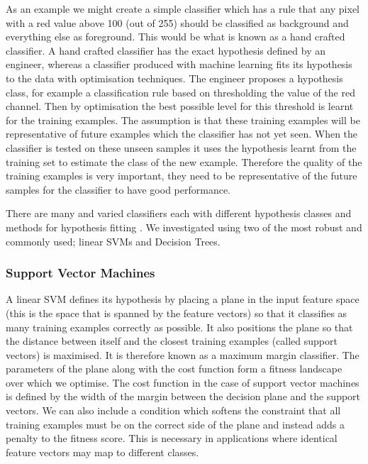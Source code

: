 \documentclass[12pt]{IIBproject}
\begin{document}
 As an example we might create a simple classifier which has a rule that any pixel with a red value above 100 (out of 255) should be classified as background and everything else as foreground. This would be what is known as a hand crafted classifier. A hand crafted classifier has the exact hypothesis defined by an engineer, whereas a classifier produced with machine learning fits its hypothesis to the data with optimisation techniques. The engineer proposes a hypothesis class, for example a classification rule based on thresholding the value of the red channel. Then by optimisation the best possible level for this threshold is learnt for the training examples. The assumption is that these training examples will be representative of future examples which the classifier has not yet seen. When the classifier is tested on these unseen samples it uses the hypothesis learnt from the training set to estimate the class of the new example. Therefore the quality of the training examples is very important, they need to be representative of the future samples for the classifier to have good performance.
 
 There are many and varied classifiers each with different hypothesis classes and methods for hypothesis fitting . We investigated using two of the most robust and commonly used; linear SVMs and Decision Trees. 
 
\subsubsection{Support Vector Machines}
A linear SVM defines its hypothesis by placing a plane in the input feature space (this is the space that is spanned by the feature vectors) so that it classifies as many training examples correctly as possible. It also positions the plane so that the distance between itself and the closest training examples (called support vectors) is maximised. It is therefore known as a maximum margin classifier. The parameters of the plane along with the cost function form a fitness landscape over which we optimise. The cost function in the case of support vector machines is defined by the width of the margin between the decision plane and the support vectors. We can also include a condition which softens the constraint that all training examples must be on the correct side of the plane and instead adds a penalty to the fitness score. This is necessary in applications where identical feature vectors may map to different classes. 
\end{document}
